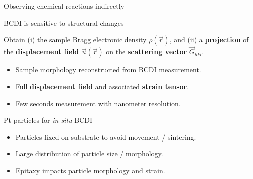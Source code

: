 \documentclass[final]{beamer}
\newlength{\colwidth}
\begin{document}
\begin{frame}[t]
\begin{columns}[t]
\begin{column}{\colwidth}
\begin{block}{Observing chemical reactions indirectly}
        
    \end{block}

    \begin{block}{BCDI is sensitive to structural changes}

        Obtain (i) the sample Bragg electronic density $\rho(\vec{r})$, and (ii) a \textbf{projection} of the \textbf{displacement field $\vec{u}(\vec{r})$} on the \textbf{scattering vector} $\vec{G}_{hkl}$.


        \begin{itemize}
            \itemsep 1.5ex
            \item Sample morphology reconstructed from BCDI measurement.
            \item Full \textbf{displacement field} and associated \textbf{strain tensor}.
            \item Few seconds measurement with nanometer resolution.
        \end{itemize}
    
    \end{block}
    
    \begin{exampleblock}{Pt particles for \textit{in-situ} BCDI}

        \begin{itemize}
            \itemsep 1.5ex
            \item Particles fixed on substrate to avoid movement / sintering.
            \item Large distribution of particle size / morphology.
            \item Epitaxy impacts particle morphology and strain.
        \end{itemize}
    

\end{exampleblock}
\end{column}
\end{columns}
\end{frame}
\end{document}
